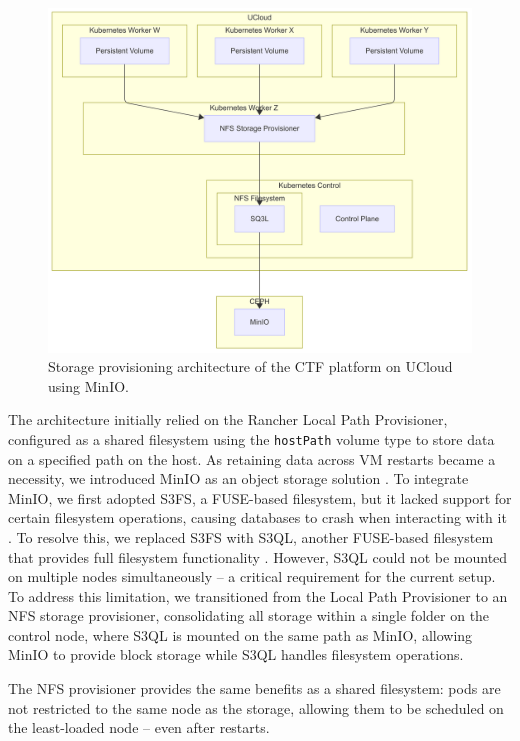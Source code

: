 \begin{figure}[h]
    \centering
    \includegraphics[width=1\textwidth]{images/storage-provisioner.png}
    \caption{Storage provisioning architecture of the CTF platform on UCloud using MinIO.}
    \label{fig:storage-provisioning}
\end{figure}

The architecture initially relied on the Rancher Local Path Provisioner, configured as a shared filesystem using the \texttt{hostPath} volume type to store data on a specified path on the host. As retaining data across VM restarts became a necessity, we introduced MinIO as an object storage solution \Parencite{miniosdu}. To integrate MinIO, we first adopted S3FS, a FUSE-based filesystem, but it lacked support for certain filesystem operations, causing databases to crash when interacting with it \Parencite{s3fsrepo}. To resolve this, we replaced S3FS with S3QL, another FUSE-based filesystem that provides full filesystem functionality \Parencite{s3qlrepo}. However, S3QL could not be mounted on multiple nodes simultaneously \Parencite{s3qlfaq} -- a critical requirement for the current setup. To address this limitation, we transitioned from the Local Path Provisioner to an NFS storage provisioner, consolidating all storage within a single folder on the control node, where S3QL is mounted on the same path as MinIO, allowing MinIO to provide block storage while S3QL handles filesystem operations.

The NFS provisioner provides the same benefits as a shared filesystem: pods are not restricted to the same node as the storage, allowing them to be scheduled on the least-loaded node -- even after restarts.

